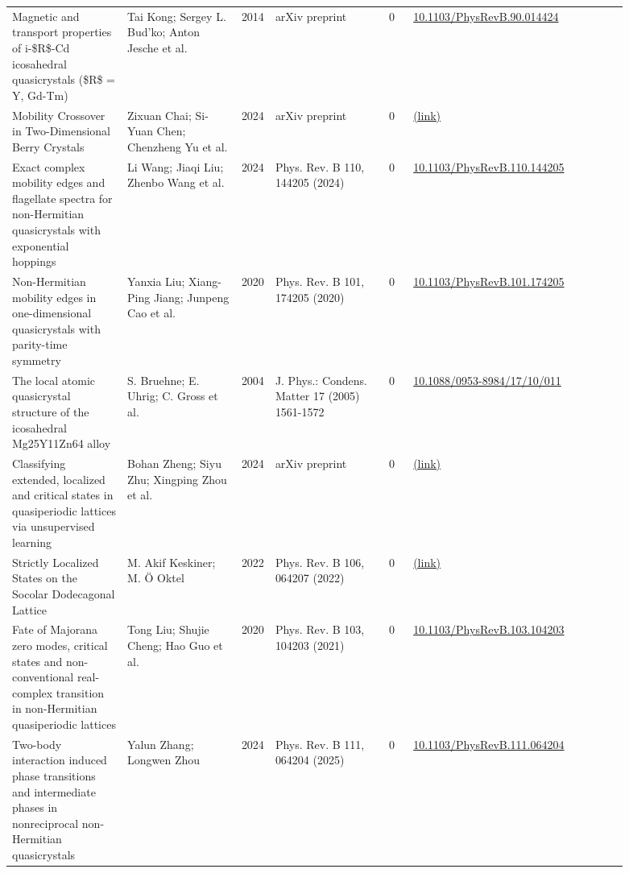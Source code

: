 \documentclass[10pt,a4paper]{article}
\begin{document}
{\begin{longtable}{p{0.192\linewidth}p{0.192\linewidth}p{0.043\linewidth}p{0.192\linewidth}p{0.043\linewidth}p{0.132\linewidth}p{0.096\linewidth}}
Magnetic and transport properties of i-\$R\$-Cd icosahedral quasicrystals (\$R\$ = Y, Gd-Tm) & Tai Kong; Sergey L. Bud'ko; Anton Jesche et al. & 2014 & arXiv preprint & 0 & \href{https://doi.org/10.1103/PhysRevB.90.014424}{10.1103/PhysRevB.90.014424} &  \\
Mobility Crossover in Two-Dimensional Berry Crystals & Zixuan Chai; Si-Yuan Chen; Chenzheng Yu et al. & 2024 & arXiv preprint & 0 & \href{http://arxiv.org/abs/2412.07117v3}{(link)} &  \\
Exact complex mobility edges and flagellate spectra for non-Hermitian quasicrystals with exponential hoppings & Li Wang; Jiaqi Liu; Zhenbo Wang et al. & 2024 & Phys. Rev. B 110, 144205 (2024) & 0 & \href{https://doi.org/10.1103/PhysRevB.110.144205}{10.1103/PhysRevB.110.144205} &  \\
Non-Hermitian mobility edges in one-dimensional quasicrystals with parity-time symmetry & Yanxia Liu; Xiang-Ping Jiang; Junpeng Cao et al. & 2020 & Phys. Rev. B 101, 174205 (2020) & 0 & \href{https://doi.org/10.1103/PhysRevB.101.174205}{10.1103/PhysRevB.101.174205} &  \\
The local atomic quasicrystal structure of the icosahedral Mg25Y11Zn64 alloy & S. Bruehne; E. Uhrig; C. Gross et al. & 2004 & J. Phys.: Condens. Matter 17 (2005) 1561-1572 & 0 & \href{https://doi.org/10.1088/0953-8984/17/10/011}{10.1088/0953-8984/17/10/011} &  \\
Classifying extended, localized and critical states in quasiperiodic lattices via unsupervised learning & Bohan Zheng; Siyu Zhu; Xingping Zhou et al. & 2024 & arXiv preprint & 0 & \href{http://arxiv.org/abs/2410.15061v1}{(link)} &  \\
Strictly Localized States on the Socolar Dodecagonal Lattice & M. Akif Keskiner; M. Ö Oktel & 2022 & Phys. Rev. B 106, 064207 (2022) & 0 & \href{http://arxiv.org/abs/2207.05552v2}{(link)} &  \\
Fate of Majorana zero modes, critical states and non-conventional real-complex transition in non-Hermitian quasiperiodic lattices & Tong Liu; Shujie Cheng; Hao Guo et al. & 2020 & Phys. Rev. B 103, 104203 (2021) & 0 & \href{https://doi.org/10.1103/PhysRevB.103.104203}{10.1103/PhysRevB.103.104203} &  \\
Two-body interaction induced phase transitions and intermediate phases in nonreciprocal non-Hermitian quasicrystals & Yalun Zhang; Longwen Zhou & 2024 & Phys. Rev. B 111, 064204 (2025) & 0 & \href{https://doi.org/10.1103/PhysRevB.111.064204}{10.1103/PhysRevB.111.064204} &  \\

\end{longtable}}
\end{document}
